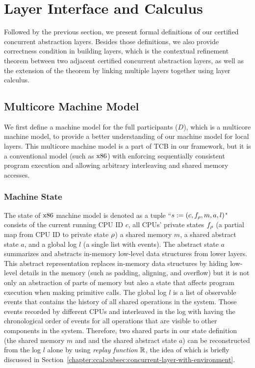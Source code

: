\section{Layer Interface and Calculus}
\label{chapter:ccal:sec:interface-calculus}

Followed by the previous section, 
we present formal definitions of our certified concurrent abstraction layers.
Besides those definitions, 
we also provide correctness condition in building layers, which is 
the contextual refinement theorem between two adjacent certified concurrent abstraction layers,
as well as the extension of the theorem by linking multiple layers together using layer calculus.


\subsection{Multicore Machine Model}
\label{capther:ccal:subsec:multicore-machine-model}


We first define a machine model for the full participants ($D$), which is a multicore machine model, 
to provide a better understanding of our machine model for local layers.
This multicore machine model is a part of TCB in our framework, but it is a conventional model (such as $\mathrm{x86}$) with enforcing sequentially consistent program
execution and allowing arbitrary interleaving
and shared memory accesses. 


\subsubsection{Machine State} 
The state of  $\mathrm{x86}$ machine model is denoted as a tuple ``$s := (c, f_{\rho}, m, a, l)$"
consists of
 the current running CPU ID $c$,
all CPUs' private states $f_\rho$ (a partial map from CPU ID to  private state $\rho$)
 a shared memory $m$,
 a shared abstract state $a$,
and  a global log $l$ (a single list with events).
The abstract state $a$ 
summarizes and abstracts in-memory low-level data structures from lower layers. 
This abstract representation replaces
in-memory data structures by hiding low-level details in the memory (such as padding, aligning, and overflow)
but it is not only an abstraction of parts of memory but also a state that affects program execution when making primitive calls. 
The global log $l$ is a list of observable events that contains the history of all shared operations in the system.
Those events recorded by different CPUs and
interleaved in the log with having the chronological order of events for all operations that are visible to other components in the system. 
Therefore, 
two shared parts in our state definition (the shared memory $m$ and 
and the shared abstract state $a$)
can be reconstructed
from the log $l$ alone by using \emph{replay function} $\mathbb{R}$,
the idea of which is briefly discussed in Section~\ref{chapter:ccal:subsec:concurrent-layer-with-environment}.


